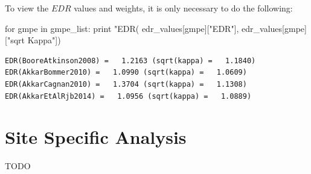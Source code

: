 To view the $EDR$ values and weights, it is only necessary to do the following:

\begin{python}
for gmpe in gmpe_list:
    print "EDR(%
        edr_values[gmpe]["EDR"], edr_values[gmpe]["sqrt Kappa"])
\end{python}

\begin{verbatim}
EDR(BooreAtkinson2008) =   1.2163 (sqrt(kappa) =   1.1840)
EDR(AkkarBommer2010) =   1.0990 (sqrt(kappa) =   1.0609)
EDR(AkkarCagnan2010) =   1.3704 (sqrt(kappa) =   1.1308)
EDR(AkkarEtAlRjb2014) =   1.0956 (sqrt(kappa) =   1.0889)
\end{verbatim}

\section{Site Specific Analysis}
\label{sec:site}

TODO